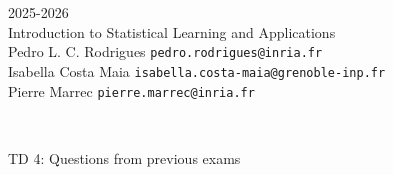 \begin{flushleft}
 \hfill {} 2025-2026 \\
Introduction to Statistical Learning and Applications \\
Pedro L. C. Rodrigues   \hfill  \texttt{pedro.rodrigues@inria.fr} \\
Isabella Costa Maia \hfill \texttt{isabella.costa-maia@grenoble-inp.fr} \\
Pierre Marrec \hfill \texttt{pierre.marrec@inria.fr}

\HRuleTop\\
\begin{center}
\Large{TD 4: Questions from previous exams}
\end{center}
\HRuleBottom
\end{flushleft}
